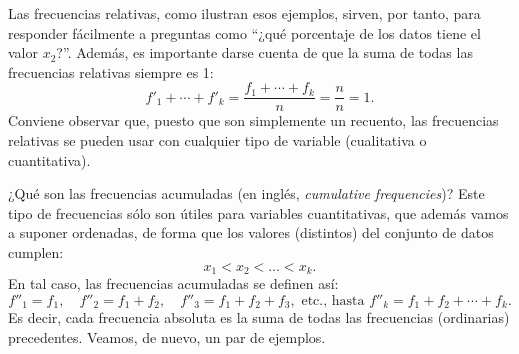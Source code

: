 Las frecuencias relativas, como ilustran esos ejemplos, sirven, por tanto, para responder fácilmente a preguntas como ``¿qué porcentaje de los datos tiene el valor $x_2$?''. Además, es importante darse cuenta de que la suma de todas las frecuencias relativas siempre es 1:
\[f'_1+\cdots+f'_k=\dfrac{f_1+\cdots+f_k}{n}=\dfrac{n}{n}=1.\]
Conviene observar que, puesto que son simplemente un recuento, las frecuencias relativas se pueden usar con cualquier tipo de variable (cualitativa o cuantitativa).

¿Qué son las {\sf frecuencias acumuladas} (en inglés, {\em cumulative frequencies})? Este tipo de frecuencias sólo son útiles para variables cuantitativas, que además vamos a suponer ordenadas, de forma que los valores (distintos) del conjunto de datos cumplen:
\[x_1<x_2<\ldots<x_k.\]
En tal caso, las frecuencias acumuladas se definen así:
\[f''_1=f_1,\quad f''_2=f_1+f_2,\quad f''_3=f_1+f_2+f_3,\mbox{ etc., hasta }f''_k=f_1+f_2+\cdots+f_k.\]
Es decir, cada frecuencia absoluta es la suma de todas las frecuencias (ordinarias) precedentes. Veamos, de nuevo, un par de ejemplos.

